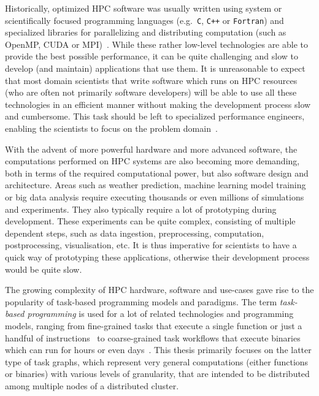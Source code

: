 Historically, optimized HPC software was usually written using system or scientifically focused
programming languages (e.g.~\texttt{C}, \texttt{C++} or
\texttt{Fortran}) and specialized libraries for parallelizing and distributing computation
(such as OpenMP, CUDA or MPI)~\cite{mpistudy}. While these rather low-level technologies are
able to provide the best possible performance, it can be quite challenging and slow to develop (and
maintain) applications that use them. It is unreasonable to expect that most domain scientists that
write software which runs on HPC resources (who are often not primarily software developers) will
be able to use all these technologies in an efficient manner without making the development process
slow and cumbersome. This task should be left to specialized performance engineers, enabling the
scientists to focus on the problem domain~\cite{dace}.

With the advent of more powerful hardware and more advanced software, the computations performed on
HPC systems are also becoming more demanding, both in terms of the required computational power,
but also software design and architecture. Areas such as weather prediction, machine learning model
training or big data analysis require executing thousands or even millions of simulations and
experiments. They also typically require a lot of prototyping during development. These experiments
can be quite complex, consisting of multiple dependent steps, such as data ingestion,
preprocessing, computation, postprocessing, visualisation, etc. It is thus imperative for
scientists to have a quick way of prototyping these applications, otherwise their development
process would be quite slow.

The growing complexity of HPC hardware, software and use-cases gave rise to the popularity of
task-based programming models and paradigms. The term \emph{task-based programming} is used for a lot of
related technologies and programming models, ranging from fine-grained tasks that execute a single
function or just a handful of instructions~\cite{starpu,openmp} to coarse-grained task workflows
that execute binaries which can run for hours or even days~\cite{dask, snakemake, nextflow}. This thesis
primarily focuses on the latter type of task graphs, which represent very general computations
(either functions or binaries) with various levels of granularity, that are intended to be
distributed among multiple nodes of a distributed cluster.

